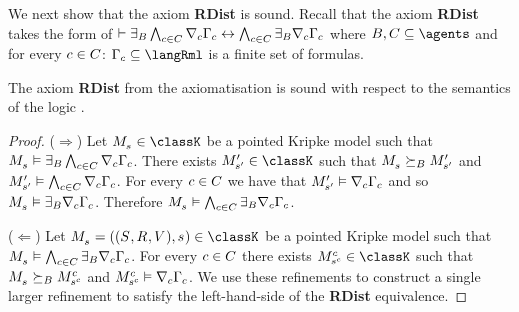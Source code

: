 \pagebreak

We next show that the axiom {\bf RDist} is sound.
Recall that the axiom {\bf RDist} takes the form of $\proves \somerefsBs \bigwedge_{\agentC \in \agentsC} \coversC \Gamma_\agentC \iff \bigwedge_{\agentC \in \agentsC} \somerefsBs \coversC \Gamma_\agentC$ where $\agentsB, \agentsC \subseteq \agents$ and for every $\agentC \in \agentsC$: $\Gamma_\agentC \subseteq \langRml$ is a finite set of formulas.

\begin{lemma}\label{rml-k-rdist}
The axiom {\bf RDist} from the axiomatisation \axiomRmlK{} is sound with respect to the semantics of the logic \logicRmlK{}.
\end{lemma}

\begin{proof}
($\Rightarrow$) Let $\kPModel{\kStateS} \in \classK$ be a pointed Kripke model such that $\kPModel{\kStateS} \entails \somerefsBs \bigwedge_{\agentC \in \agentsC} \coversC \Gamma_\agentC$.
There exists $\kPModelP{\kStateSP} \in \classK$ such that $\kPModel{\kStateS} \simulatesBs \kPModelP{\kStateSP}$ and $\kPModelP{\kStateSP} \entails \bigwedge_{\agentC \in \agentsC} \coversC \Gamma_\agentC$.
For every $\agentC \in \agentsC$ we have that $\kPModelP{\kStateSP} \entails \coversC \Gamma_\agentC$ and so $\kPModel{\kStateS} \entails \somerefsBs \coversC \Gamma_\agentC$.
Therefore $\kPModel{\kStateS} \entails \bigwedge_{\agentC \in \agentsC} \somerefsBs \coversC \Gamma_\agentC$.

($\Leftarrow$) Let $\kPModelAndTuple{\kStateS} \in \classK$ be a pointed Kripke model such that $\kPModel{\kStateS} \entails \bigwedge_{\agentC \in \agentsC} \somerefsBs \coversC \Gamma_\agentC$.
For every $\agentC \in \agentsC$ there exists $\kPModel[\agentC]{\kStateS[\agentC]} \in \classK$ such that $\kPModel{\kStateS} \simulatesBs \kPModel[\agentC]{\kStateS[\agentC]}$ and $\kPModel[\agentC]{\kStateS[\agentC]} \entails \coversC \Gamma_\agentC$.
We use these refinements to construct a single larger refinement to satisfy the left-hand-side of the {\bf RDist} equivalence.


\end{proof}
